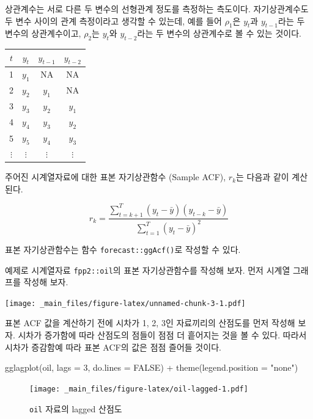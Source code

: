 \documentclass[
]{book}
\newenvironment{Shaded}{\begin{snugshade}}{\end{snugshade}}
\newcommand{\AttributeTok}[1]{\textcolor[rgb]{0.77,0.63,0.00}{#1}}
\newcommand{\ConstantTok}[1]{\textcolor[rgb]{0.00,0.00,0.00}{#1}}
\newcommand{\DecValTok}[1]{\textcolor[rgb]{0.00,0.00,0.81}{#1}}
\newcommand{\FunctionTok}[1]{\textcolor[rgb]{0.00,0.00,0.00}{#1}}
\newcommand{\NormalTok}[1]{#1}
\newcommand{\SpecialCharTok}[1]{\textcolor[rgb]{0.00,0.00,0.00}{#1}}
\newcommand{\StringTok}[1]{\textcolor[rgb]{0.31,0.60,0.02}{#1}}
\begin{document}
상관계수는 서로 다른 두 변수의 선형관계 정도를 측정하는 측도이다. 자기상관계수도 두 변수 사이의 관계 측정이라고 생각할 수 있는데, 예를 들어 \(\rho_{1}\)은 \(y_{t}\)과 \(y_{t-1}\)라는 두 변수의 상관계수이고, \(\rho_{2}\)는 \(y_{t}\)와 \(y_{t-2}\)라는 두 변수의 상관계수로 볼 수 있는 것이다.

\begin{longtable}[]{@{}cccc@{}}
\toprule
\(t\) & \(y_{t}\) & \(y_{t-1}\) & \(y_{t-2}\) \\
\midrule
\endhead
1 & \(y_{1}\) & NA & NA \\
2 & \(y_{2}\) & \(y_{1}\) & NA \\
3 & \(y_{3}\) & \(y_{2}\) & \(y_{1}\) \\
4 & \(y_{4}\) & \(y_{3}\) & \(y_{2}\) \\
5 & \(y_{5}\) & \(y_{4}\) & \(y_{3}\) \\
\(\vdots\) & \(\vdots\) & \(\vdots\) & \(\vdots\) \\
\bottomrule
\end{longtable}

주어진 시계열자료에 대한 표본 자기상관함수 (Sample ACF), \(r_{k}\)는 다음과 같이 계산된다.

\[
r_{k} = \frac{\sum_{t=k+1}^{T}(y_{t}-\bar{y})(y_{t-k}-\bar{y})}{\sum_{t=1}^{T}(y_{t}-\bar{y})^{2}}
\]

표본 자기상관함수는 함수 \texttt{forecast::ggAcf()}로 작성할 수 있다.

예제로 시계열자료 \texttt{fpp2::oil}의 표본 자기상관함수를 작성해 보자.
먼저 시계열 그래프를 작성해 보자.

\texttt{[image: \_main\_files/figure-latex/unnamed-chunk-3-1.pdf]}

표본 ACF 값을 계산하기 전에 시차가 1, 2, 3인 자료끼리의 산점도를 먼저 작성해 보자.
시차가 증가함에 따라 산점도의 점들이 점점 더 흩어지는 것을 볼 수 있다.
따라서 시차가 증감함예 따라 표본 ACF의 값은 점점 즐어들 것이다.

\begin{Shaded}
\begin{Highlighting}[]
\FunctionTok{gglagplot}\NormalTok{(oil, }\AttributeTok{lags =} \DecValTok{3}\NormalTok{, }\AttributeTok{do.lines =} \ConstantTok{FALSE}\NormalTok{) }\SpecialCharTok{+} 
  \FunctionTok{theme}\NormalTok{(}\AttributeTok{legend.position =} \StringTok{"none"}\NormalTok{)}
\end{Highlighting}
\end{Shaded}

\begin{figure}
\centering
\texttt{[image: \_main\_files/figure-latex/oil-lagged-1.pdf]}
\caption{\label{fig:oil-lagged}\texttt{oil} 자료의 lagged 산점도}
\end{figure}
\end{document}
